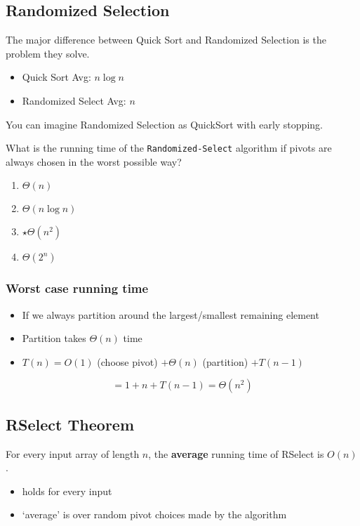 \documentclass{article}
\begin{document}
\subsection*{Randomized Selection}

The major difference between Quick Sort and Randomized Selection
is the problem they solve.

\begin{itemize}
    \item Quick Sort Avg: \(n \log n\)
    \item Randomized Select Avg: \(n\)
\end{itemize}

You can imagine Randomized Selection as QuickSort with early stopping.

What is the running time of the \texttt{Randomized-Select} algorithm if pivots are always chosen in the worst possible way?

\begin{enumerate}[label=\Alph*:]
    \item \(\Theta(n)\)
    \item \(\Theta(n \log n)\)
    \item \(\star \Theta(n^2)\)
    \item \(\Theta(2^n)\)
\end{enumerate}

\subsubsection*{Worst case running time}
\begin{itemize}
    \item If we always partition around the largest/smallest remaining element
    \item Partition takes \(\Theta(n)\) time
    \item \(T(n) = O(1)\) (choose pivot) \(+ \Theta(n)\) (partition) \(+ T(n-1)\)
\end{itemize}
\begin{equation*}
    = 1 + n + T(n-1) = \Theta(n^2)
\end{equation*}

\subsection*{RSelect Theorem}
For every input array of length $n$, the \textbf{average} running time of
RSelect is \(O(n)\).

\begin{itemize}
    \item holds for every input
    \item `average' is over random pivot choices made by the algorithm
\end{itemize}
\end{document}
